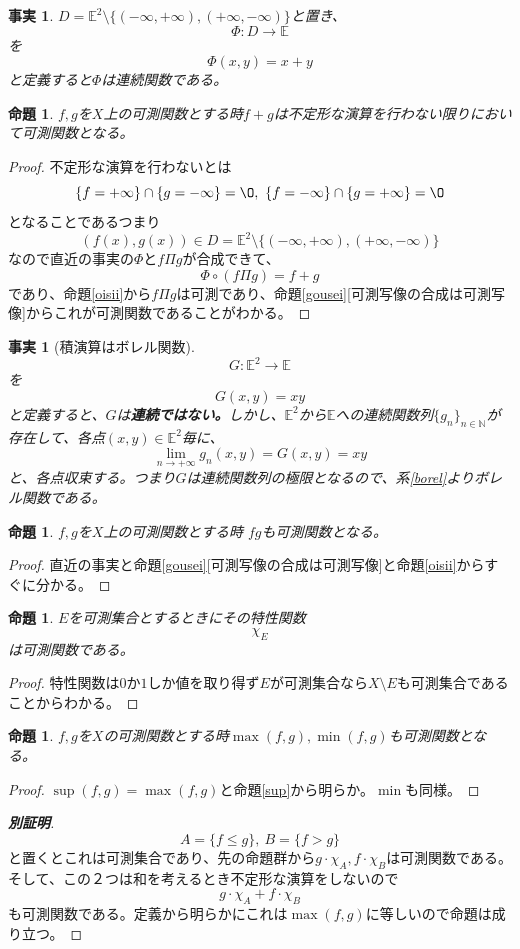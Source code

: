 \documentclass[leqno]{jsarticle}
\newtheorem{prop}[thm]{命題}
\newtheorem{fact}[thm]{事実}
\newcommand{\nn}{\mathbb{N}}
\newcommand{\mgn}{\infty}
\newcommand{\rrr}{\mathbb{E}}
\begin{document}
\begin{fact}$D=\rrr^2\setminus \{(-\mgn,+\mgn),(+\mgn,-\mgn)\}$と置き、
\[
\Phi:D\to \rrr
\]を
\[
\Phi(x,y)=x+y
\]
と定義すると$\Phi$は連続関数である。
\end{fact}



\begin{prop}$f,g$を$X$上の可測関数とする時$f+g$は不定形な演算を行わない限りにおいて可測関数となる。
\end{prop}
\begin{proof}不定形な演算を行わないとは
\[
\{f=+\mgn\}\cap\{g=-\mgn\}=\O,\ \{f=-\mgn\}\cap\{g=+\mgn\}=\O
\]
となることであるつまり
\[
(f(x),g(x))\in D=\rrr^2\setminus \{(-\mgn,+\mgn),(+\mgn,-\mgn)\}
\]
なので直近の事実の$\Phi$と$f\Pi g$が合成できて、
\[
\Phi \circ(f\Pi g)=f+g
\]
であり、命題\ref{oisii}から$f\Pi g$は可測であり、命題\ref{gousei}[可測写像の合成は可測写像]からこれが可測関数であることがわかる。
\end{proof}


\begin{fact}[積演算はボレル関数]
\[
G:\rrr^2\to \rrr
\]
を
\[
G(x,y)=xy
\]
と定義すると、$G$は{\bf 連続ではない。}しかし、$\rrr^2$から$\rrr$への連続関数列$\{g_{n}\}_{n\in\nn}$が存在して、各点$(x,y)\in \rrr^2$毎に、
\[
\lim_{n\to+\mgn}g_{n}(x,y)=G(x,y)=xy
\]
と、各点収束する。つまり$G$は連続関数列の極限となるので、系\ref{borel}よりボレル関数である。
\end{fact}


\begin{prop}$f,g$を$X$上の可測関数とする時
$fg$も可測関数となる。
\end{prop}
\begin{proof}直近の事実と命題\ref{gousei}[可測写像の合成は可測写像]と命題\ref{oisii}からすぐに分かる。
\end{proof}


\begin{prop}$E$を可測集合とするときにその特性関数
\[
\chi_{E}
\]
は可測関数である。
\end{prop}
\begin{proof}
特性関数は$0$か$1$しか値を取り得ず$E$が可測集合なら$X\setminus E$も可測集合であることからわかる。
\end{proof}



\begin{prop}$f,g$を$X$の可測関数とする時$\max(f,g),\min(f,g)$も可測関数となる。
\end{prop}
\begin{proof}
$\sup(f,g)=\max(f,g)$と命題\ref{sup}から明らか。$\min$も同様。
\end{proof}
\begin{proof}[{\bf 別証明}]
\[
A=\{f\le g\},\ B=\{f>g\}
\]
と置くとこれは可測集合であり、先の命題群から$g\cdot \chi_{A},f\cdot \chi_{B}$は可測関数である。そして、この２つは和を考えるとき不定形な演算をしないので
\[
g\cdot\chi_{A}+f\cdot \chi_{B}
\]
も可測関数である。定義から明らかにこれは$\max(f,g)$に等しいので命題は成り立つ。
\end{proof}
\end{document}
